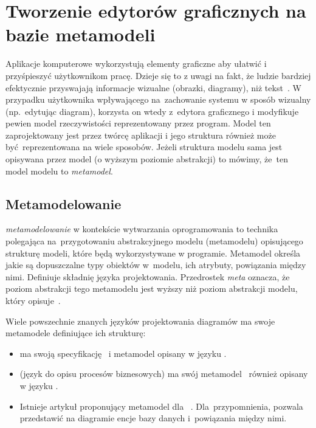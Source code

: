 \chapter{Tworzenie edytorów graficznych na bazie metamodeli}

Aplikacje komputerowe wykorzystują elementy graficzne aby ułatwić i
przyśpieszyć użytkownikom pracę.
Dzieje się to z uwagi na fakt, że ludzie bardziej efektycznie przyswajają
informacje wizualne (obrazki, diagramy), niż
tekst~\cite{images-more-effective-article}.
W przypadku użytkownika
wpływającego na~zachowanie systemu w sposób wizualny (np.\ edytując diagram),
korzysta on wtedy z~edytora graficznego i modyfikuje pewien model
rzeczywistości reprezentowany przez program. Model ten zaprojektowany jest
przez twórcę aplikacji i jego struktura również może być~reprezentowana na
wiele sposobów. Jeżeli struktura modelu sama jest opisywana przez model (o
wyższym poziomie abstrakcji) to mówimy, że~ten model modelu to
\emph{metamodel}.

\section{Metamodelowanie}

\emph{\Gls{metamodelowanie}} w kontekście wytwarzania oprogramowania to
technika polegająca
na~przygotowaniu abstrakcyjnego modelu (metamodelu) opisującego strukturę
modeli, które będą wykorzystywane w programie. Metamodel określa jakie są
dopuszczalne typy obiektów w~modelu, ich atrybuty, powiązania między nimi.
Definiuje składnię języka projektowania. Przedrostek \emph{meta} oznacza, że
poziom abstrakcji tego metamodelu jest wyższy niż poziom abstrakcji modelu,
który opisuje~\cite{from-requirements-to-java-in-a-snap}.

Wiele powszechnie znanych języków projektowania diagramów ma swoje metamodele
definiujące ich strukturę:

\begin{itemize}
	\item {} ma swoją specyfikację~\cite{uml-omg-specification}
	      i metamodel opisany w języku .

	\item {} (język do opisu procesów biznesowych) ma swój
	      metamodel~\cite{bpmn2-metamodel} również opisany w języku .

	\item Istnieje artykuł proponujący metamodel dla ~\cite{entity-relationship-metamodel}. Dla~przypomnienia,  pozwala przedstawić na diagramie encje bazy danych i~powiązania między nimi.
\end{itemize}

